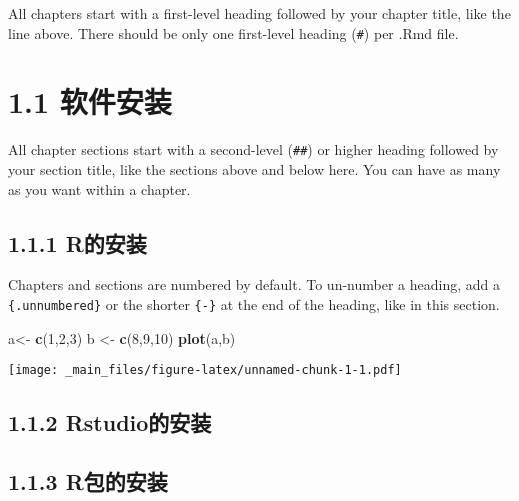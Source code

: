\documentclass[
]{book}
\newenvironment{Shaded}{\begin{snugshade}}{\end{snugshade}}
\newcommand{\DecValTok}[1]{\textcolor[rgb]{0.00,0.00,0.81}{#1}}
\newcommand{\FunctionTok}[1]{\textcolor[rgb]{0.13,0.29,0.53}{\textbf{#1}}}
\newcommand{\NormalTok}[1]{#1}
\newcommand{\OtherTok}[1]{\textcolor[rgb]{0.56,0.35,0.01}{#1}}
\theoremstyle{definition}
\theoremstyle{definition}
\theoremstyle{definition}
\theoremstyle{definition}
\theoremstyle{remark}
\begin{document}
All chapters start with a first-level heading followed by your chapter title, like the line above. There should be only one first-level heading (\texttt{\#}) per .Rmd file.

\hypertarget{ux8f6fux4ef6ux5b89ux88c5}{%
\section*{1.1 软件安装}\label{ux8f6fux4ef6ux5b89ux88c5}}

All chapter sections start with a second-level (\texttt{\#\#}) or higher heading followed by your section title, like the sections above and below here. You can have as many as you want within a chapter.

\hypertarget{rux7684ux5b89ux88c5}{%
\subsection*{1.1.1 R的安装}\label{rux7684ux5b89ux88c5}}

Chapters and sections are numbered by default. To un-number a heading, add a \texttt{\{.unnumbered\}} or the shorter \texttt{\{-\}} at the end of the heading, like in this section.

\begin{Shaded}
\begin{Highlighting}[]
\NormalTok{a}\OtherTok{\textless{}{-}} \FunctionTok{c}\NormalTok{(}\DecValTok{1}\NormalTok{,}\DecValTok{2}\NormalTok{,}\DecValTok{3}\NormalTok{)}
\NormalTok{b }\OtherTok{\textless{}{-}} \FunctionTok{c}\NormalTok{(}\DecValTok{8}\NormalTok{,}\DecValTok{9}\NormalTok{,}\DecValTok{10}\NormalTok{)}
\FunctionTok{plot}\NormalTok{(a,b)}
\end{Highlighting}
\end{Shaded}

\texttt{[image: \_main\_files/figure-latex/unnamed-chunk-1-1.pdf]}

\hypertarget{rstudioux7684ux5b89ux88c5}{%
\subsection*{1.1.2 Rstudio的安装}\label{rstudioux7684ux5b89ux88c5}}

\hypertarget{rux5305ux7684ux5b89ux88c5}{%
\subsection*{1.1.3 R包的安装}\label{rux5305ux7684ux5b89ux88c5}}
\end{document}
